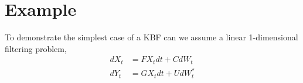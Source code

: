 %

%
%




\section{Example}

To demonstrate the simplest case of a KBF can we assume a linear 1-dimensional filtering problem,
\begin{align*}
    dX_t &= F X_t dt + C dW_t \\
    dY_t &= G X_t dt + U dW_t^*
\end{align*}

